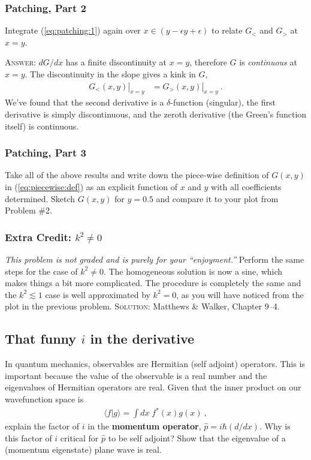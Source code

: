 \documentclass[12pt]{article}
\numberwithin{equation}{subsection}    %
\begin{document}
\subsubsection{Patching, Part 2}

Integrate (\ref{eq:patching:1}) again over $x\in(y-\epsilon y+\epsilon)$ to relate $G_<$ and $G_>$ at $x=y$.


\textsc{Answer}: $dG/dx$ has a finite discontinuity at $x=y$, therefore $G$ is \emph{continuous} at $x=y$. The discontinuity in the slope gives a kink in $G$,
\begin{align}
	\left.G_<(x, y)\right|_{x=y} &= \left.G_>(x, y)\right|_{x=y} \ .
\end{align}
We've found that the second derivative is a $\delta$-function (singular), the first derivative is simply discontinuous, and the zeroth derivative (the Green's function itself) is continuous.

\subsubsection{Patching, Part 3}

Take all of the above results and write down the piece-wise definition of $G(x,y)$ in (\ref{eq:piecewise:def}) as an explicit function of $x$ and $y$ with all coefficients determined. Sketch $G(x,y)$  for $y=0.5$ and compare it to your plot from Problem \#2.

\subsubsection{Extra Credit: $k^2\neq 0$}

\emph{This problem is not graded and is purely for your ``enjoyment.''} Perform the same steps for the case of $k^2\neq 0$. The homogeneous solution is now a sine, which makes things a bit more complicated. The procedure is completely the same and the $k^2 \lesssim 1$ case is well approximated by $k^2=0$, as you will have noticed from the plot in the previous problem. \textsc{Solution}: Matthews \& Walker, Chapter 9--4. 


\subsection{That funny $i$ in the derivative}

In quantum mechanics, observables are Hermitian (self adjoint) operators. This is important because the value of the observable is a real number and the eigenvalues of Hermitian operators are real. Given that the inner product on our wavefunction space is
\begin{align}
	\langle f | g \rangle = \int dx \; f^*(x) g(x) \ ,
\end{align}
	explain the factor of $i$ in the \textbf{momentum operator}, $\hat p = i\hbar(d/dx)$. Why is this factor of $i$ critical for $\hat p$ to be self adjoint? Show that the eigenvalue of a (momentum eigenstate) plane wave is real. 
\end{document}
